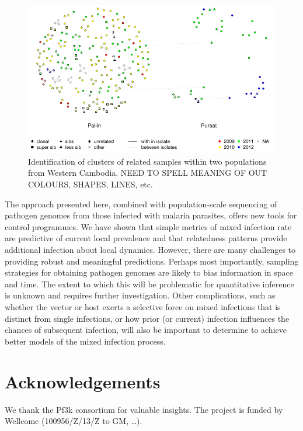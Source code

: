 \documentclass[9pt,lineno]{elife}
\begin{document}
\begin{figure}[h]
  \centering{}
  \includegraphics[width=\textwidth]{Fig7.pdf}
  \caption{Identification of clusters of related samples within two populations from Western Cambodia.  NEED TO SPELL MEANING OF OUT COLOURS, SHAPES, LINES, etc.}
  \label{fig:NNplot}
\end{figure}



The approach presented here, combined with population-scale sequencing of pathogen genomes from those infected with malaria parasites, offers new tools for control programmes.  We have shown that simple metrics of mixed infection rate are predictive of current local prevalence and that relatedness patterns provide additional infection about local dynamics.  However, there are many challenges to providing robust and meaningful predictions.  Perhaps most importantly, sampling strategies for obtaining pathogen genomes are likely to bias information in space and time.  The extent to which this will be problematic for quantitative inference is unknown and requires further investigation.  Other complications, such as whether the vector or host exerts a selective force on mixed infections that is distinct from single infections, or how prior (or current) infection influences the chances of subsequent infection, will also be important to determine to achieve better models of the mixed infection process.



\section{Acknowledgements}
We thank the Pf3k consortium for valuable insights. The project is funded by  Wellcome (100956/Z/13/Z to GM, \ldots).
\end{document}
